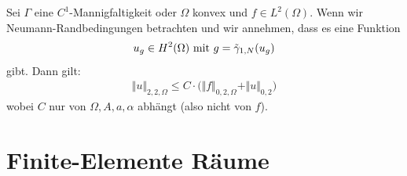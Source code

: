 \begin{theorem}[Regularität]\label{theorem3.3}\enter
	Sei $\Gamma$ eine $C^1$-Mannigfaltigkeit oder $\Omega$ konvex und $f\in L^2(\Omega)$. Wenn wir Neumann-Randbedingungen betrachten und wir annehmen, dass es eine Funktion 
\begin{align*}
u_g\in H^2(\Omega)\mit g=\tilde{\gamma}_{1,N}(u_g)
\end{align*}
gibt. Dann gilt:
\begin{align*}
\Vert u\Vert_{2,2,\Omega}\leq C\cdot\Big(\Vert f\Vert_{0,2,\Omega}+\Vert u\Vert_{0,2}\Big)
\end{align*}
wobei $C$ nur von $\Omega, A,a,\alpha$ abhängt (also nicht von $f$).
\end{theorem}

\section{Finite-Elemente Räume} %
